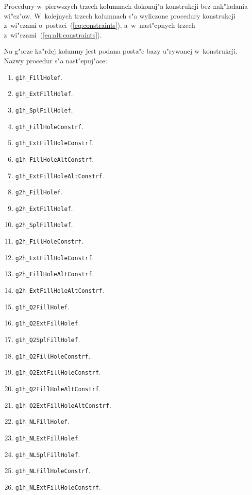 Procedury w~pierwszych trzech kolumnach dokonuj"a konstrukcji bez nak"ladania
wi"ez"ow. W~kolejnych trzech kolumnach s"a wyliczone procedury konstrukcji
z~wi"ezami o~postaci~(\ref{eq:constraints}), a~w~nast"epnych trzech
z~wi"ezami~(\ref{eq:alt:constraints}).

Na g"orze ka"rdej kolumny jest podana posta"c bazy u"rywanej w~konstrukcji.
Nazwy procedur s"a nast"epuj"ace:

\begin{enumerate}
\item \texttt{g1h\_FillHolef}.
\item \texttt{g1h\_ExtFillHolef}.
\item \texttt{g1h\_SplFillHolef}.
\item \texttt{g1h\_FillHoleConstrf}.
\item \texttt{g1h\_ExtFillHoleConstrf}.
\addtocounter{enumi}{1}
\item \texttt{g1h\_FillHoleAltConstrf}.
\item \texttt{g1h\_ExtFillHoleAltConstrf}.
\addtocounter{enumi}{1}
\item \texttt{g2h\_FillHolef}.
\item \texttt{g2h\_ExtFillHolef}.
\item \texttt{g2h\_SplFillHolef}.
\item \texttt{g2h\_FillHoleConstrf}.
\item \texttt{g2h\_ExtFillHoleConstrf}.
\addtocounter{enumi}{1}
\item \texttt{g2h\_FillHoleAltConstrf}.
\item \texttt{g2h\_ExtFillHoleAltConstrf}.
\addtocounter{enumi}{1}
\item \texttt{g1h\_Q2FillHolef}.
\item \texttt{g1h\_Q2ExtFillHolef}.
\item \texttt{g1h\_Q2SplFillHolef}.
\item \texttt{g1h\_Q2FillHoleConstrf}.
\item \texttt{g1h\_Q2ExtFillHoleConstrf}.
\addtocounter{enumi}{1}
\item \texttt{g1h\_Q2FillHoleAltConstrf}.
\item \texttt{g1h\_Q2ExtFillHoleAltConstrf}.
\addtocounter{enumi}{1}
\item \texttt{g1h\_NLFillHolef}.
\item \texttt{g1h\_NLExtFillHolef}.
\item \texttt{g1h\_NLSplFillHolef}.
\item \texttt{g1h\_NLFillHoleConstrf}.
\item \texttt{g1h\_NLExtFillHoleConstrf}.

\end{enumerate}

